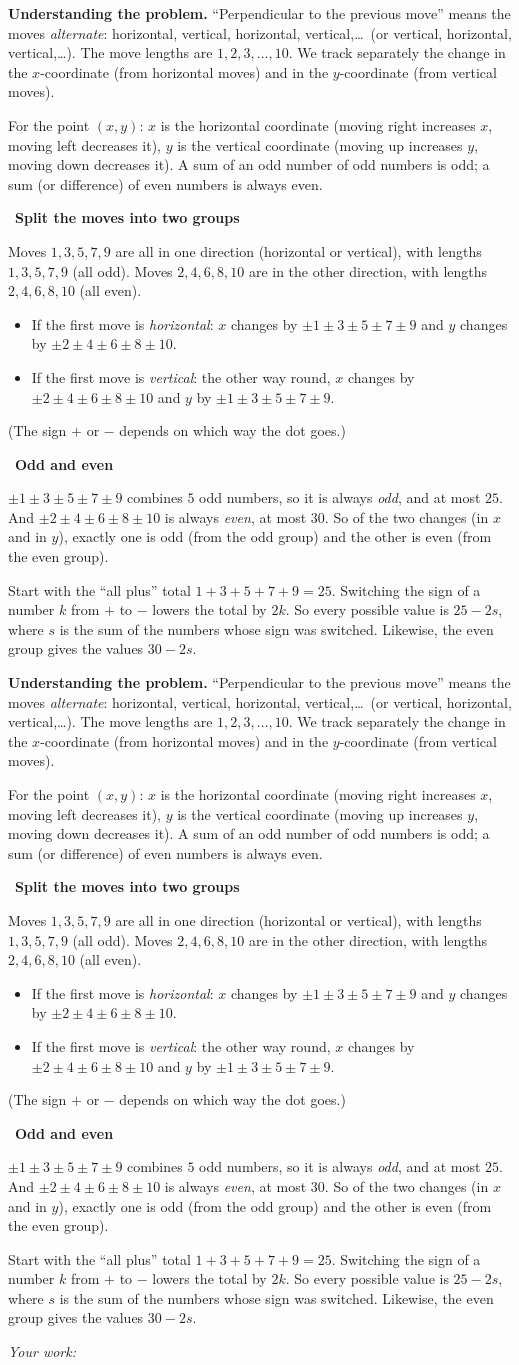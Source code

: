 \documentclass[11pt]{article}
\newif\ifsol \soltrue
\newcommand{\probsol}[1]{%
  \begin{lrbox}{\solmeasure}\begin{minipage}{\dimexpr\linewidth-24pt\relax}#1\end{minipage}\end{lrbox}%
  \ifsol
    \begin{solbox}#1\end{solbox}%
  \else
    \setlength{\solht}{\dimexpr\ht\solmeasure+\dp\solmeasure+0.85cm\relax}%
    \ifdim\solht<1.35cm\setlength{\solht}{1.35cm}\fi
    \ifdim\solht>\StudentMaxWork\setlength{\solht}{\StudentMaxWork}\fi
    \begin{tcolorbox}[colback=white,colframe=Line,boxrule=0.8pt,arc=5pt,
      left=8pt,right=8pt,top=4pt,bottom=4pt,height=\solht]{\footnotesize\color{Slate}\itshape\WorkWord}\end{tcolorbox}%
  \fi}
\newlength{\StudentMaxWork}\setlength{\StudentMaxWork}{7.5cm}
\newcommand{\step}[2]{\par\smallskip\noindent{\bfseries\color{tmBlue!85!black}\StepWord~#1.}\ {\bfseries #2}\par\nopagebreak}
\def\WorkWord{Your work:}
\def\StepWord{Step}
\begin{document}
\probsol{
\textbf{Understanding the problem.} ``Perpendicular to the previous move'' means the moves \emph{alternate}: horizontal, vertical, horizontal, vertical,\dots\ (or vertical, horizontal, vertical,\dots). The move lengths are $1,2,3,\dots,10$. We track separately the change in the $x$-coordinate (from horizontal moves) and in the $y$-coordinate (from vertical moves).

\begin{recallbox}For the point $(x,y)$: $x$ is the horizontal coordinate (moving right increases $x$, moving left decreases it), $y$ is the vertical coordinate (moving up increases $y$, moving down decreases it). A sum of an odd number of odd numbers is odd; a sum (or difference) of even numbers is always even.\end{recallbox}

\step{1}{Split the moves into two groups}
Moves $1,3,5,7,9$ are all in one direction (horizontal or vertical), with lengths $1,3,5,7,9$ (all odd). Moves $2,4,6,8,10$ are in the other direction, with lengths $2,4,6,8,10$ (all even).
\begin{itemize}[leftmargin=1.4em,itemsep=1pt]
\item If the first move is \emph{horizontal}: $x$ changes by $\pm1\pm3\pm5\pm7\pm9$ and $y$ changes by $\pm2\pm4\pm6\pm8\pm10$.
\item If the first move is \emph{vertical}: the other way round, $x$ changes by $\pm2\pm4\pm6\pm8\pm10$ and $y$ by $\pm1\pm3\pm5\pm7\pm9$.
\end{itemize}
(The sign $+$ or $-$ depends on which way the dot goes.)

\step{2}{Odd and even}
$\pm1\pm3\pm5\pm7\pm9$ combines $5$ odd numbers, so it is always \emph{odd}, and at most $25$. And $\pm2\pm4\pm6\pm8\pm10$ is always \emph{even}, at most $30$. So of the two changes (in $x$ and in $y$), exactly one is odd (from the odd group) and the other is even (from the even group).

\begin{proofbox}Start with the ``all plus'' total $1+3+5+7+9=25$. Switching the sign of a number $k$ from $+$ to $-$ lowers the total by $2k$. So every possible value is $25-2s$, where $s$ is the sum of the numbers whose sign was switched. Likewise, the even group gives the values $30-2s$.\end{proofbox}

}
\end{document}
